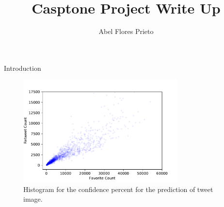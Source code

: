 \documentclass[12pt,letterpaper]{article}
\author{Abel Flores Prieto}
\title{Casptone Project Write Up}
\begin{document}
\maketitle

Introduction

\begin{figure}[h!]
    \centering
    \includegraphics[width=0.75\textwidth]{imgs/sample_figure.pdf}
    \caption{\label{fig:test}Histogram for the confidence percent for
    the prediction of tweet image.}
\end{figure}
\end{document}
